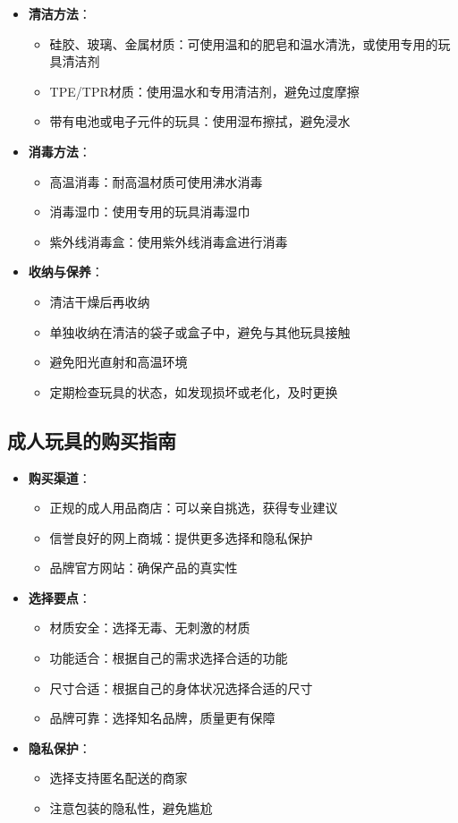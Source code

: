 \documentclass[12pt,UTF8]{ctexbook}
\begin{document}
\begin{itemize}
	\item \textbf{清洁方法}：
	\begin{itemize}
		\item 硅胶、玻璃、金属材质：可使用温和的肥皂和温水清洗，或使用专用的玩具清洁剂
		\item TPE/TPR材质：使用温水和专用清洁剂，避免过度摩擦
		\item 带有电池或电子元件的玩具：使用湿布擦拭，避免浸水
	\end{itemize}
	\item \textbf{消毒方法}：
	\begin{itemize}
		\item 高温消毒：耐高温材质可使用沸水消毒
		\item 消毒湿巾：使用专用的玩具消毒湿巾
		\item 紫外线消毒盒：使用紫外线消毒盒进行消毒
	\end{itemize}
	\item \textbf{收纳与保养}：
	\begin{itemize}
		\item 清洁干燥后再收纳
		\item 单独收纳在清洁的袋子或盒子中，避免与其他玩具接触
		\item 避免阳光直射和高温环境
		\item 定期检查玩具的状态，如发现损坏或老化，及时更换
	\end{itemize}
\end{itemize}

\subsection{成人玩具的购买指南}

\begin{itemize}
	\item \textbf{购买渠道}：
	\begin{itemize}
		\item 正规的成人用品商店：可以亲自挑选，获得专业建议
		\item 信誉良好的网上商城：提供更多选择和隐私保护
		\item 品牌官方网站：确保产品的真实性
	\end{itemize}
	\item \textbf{选择要点}：
	\begin{itemize}
		\item 材质安全：选择无毒、无刺激的材质
		\item 功能适合：根据自己的需求选择合适的功能
		\item 尺寸合适：根据自己的身体状况选择合适的尺寸
		\item 品牌可靠：选择知名品牌，质量更有保障
	\end{itemize}
	\item \textbf{隐私保护}：
	\begin{itemize}
		\item 选择支持匿名配送的商家
		\item 注意包装的隐私性，避免尴尬
	\end{itemize}
\end{itemize}
\end{document}
